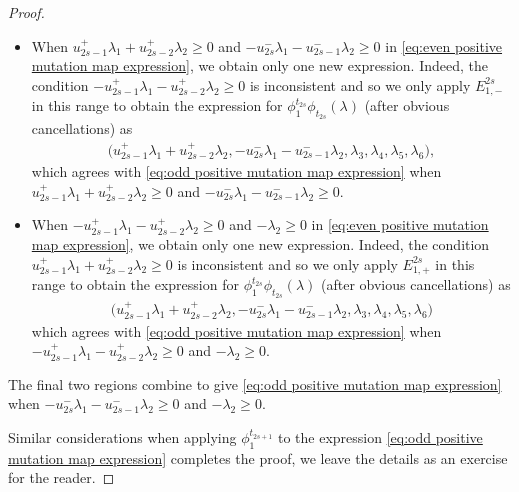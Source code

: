 \documentclass{amsart}
\numberwithin{theorem}{section}
\begin{document}
\begin{proof}
\begin{itemize}
      \item When $u_{2s-1}^+\lambda_1+u_{2s-2}^+\lambda_2 \ge 0$ and $-u_{2s}^-\lambda_1-u_{2s-1}^-\lambda_2 \ge 0$ in \eqref{eq:even positive mutation map expression}, we obtain only one new expression.
        Indeed, the condition $-u_{2s-1}^+\lambda_1-u_{2s-2}^+\lambda_2 \ge 0$ is inconsistent and so we only apply $E^{2s}_{1,-}$ in this range to obtain the expression for $\phi^{t_{2s}}_1\phi_{t_{2s}}(\lambda)$ (after obvious cancellations) as
        \begin{align*}
          \big(u_{2s-1}^+\lambda_1+u_{2s-2}^+\lambda_2,-u_{2s}^-\lambda_1-u_{2s-1}^-\lambda_2,\lambda_3,\lambda_4,\lambda_5,\lambda_6\big),
        \end{align*}
        which agrees with \eqref{eq:odd positive mutation map expression} when $u_{2s-1}^+\lambda_1+u_{2s-2}^+\lambda_2 \ge 0$ and $-u_{2s}^-\lambda_1-u_{2s-1}^-\lambda_2 \ge 0$.

      \item When $-u_{2s-1}^+\lambda_1-u_{2s-2}^+\lambda_2 \ge 0$ and $-\lambda_2 \ge 0$ in \eqref{eq:even positive mutation map expression}, we obtain only one new expression.
        Indeed, the condition $u_{2s-1}^+\lambda_1+u_{2s-2}^+\lambda_2 \ge 0$ is inconsistent and so we only apply $E^{2s}_{1,+}$ in this range to obtain the expression for $\phi^{t_{2s}}_1\phi_{t_{2s}}(\lambda)$ (after obvious cancellations) as
        \begin{align*}
          (u_{2s-1}^+\lambda_1+u_{2s-2}^+\lambda_2,-u_{2s}^-\lambda_1-u_{2s-1}^-\lambda_2,\lambda_3,\lambda_4,\lambda_5,\lambda_6\big)
        \end{align*}
        which agrees with \eqref{eq:odd positive mutation map expression} when $-u_{2s-1}^+\lambda_1-u_{2s-2}^+\lambda_2 \ge 0$ and $-\lambda_2 \ge 0$.
    \end{itemize}
    The final two regions combine to give \eqref{eq:odd positive mutation map expression} when $-u_{2s}^-\lambda_1-u_{2s-1}^-\lambda_2 \ge 0$ and $-\lambda_2 \ge 0$.

    Similar considerations when applying $\phi^{t_{2s+1}}_1$ to the expression \eqref{eq:odd positive mutation map expression} completes the proof, we leave the details as an exercise for the reader.




\end{proof}
\end{document}
